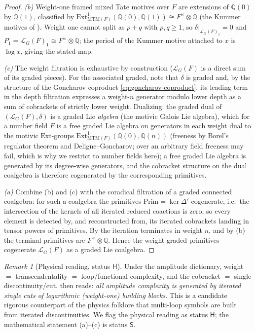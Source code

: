 \documentclass[12pt]{article}
\theoremstyle{definition}
\theoremstyle{remark}
\newtheorem{remark}[theorem]{Remark}
\newcommand{\LG}{\mathcal{L}_{G}}
\newcommand{\coA}{\Delta}
\newcommand{\cobr}{\delta}
\newcommand{\Prim}{\mathrm{Prim}}
\newcommand{\Qbb}{\mathbb{Q}}
\newcommand{\Slab}{\ensuremath{\mathsf{S}}}
\newcommand{\Hlab}{\ensuremath{\mathsf{H}}}
\begin{document}
\begin{proof}
\emph{(b)} Weight-one framed mixed Tate motives over $F$ are extensions of $\Qbb(0)$ by
$\Qbb(1)$, classified by $\mathrm{Ext}^1_{\mathrm{MTM}(F)}(\Qbb(0),\Qbb(1))\cong
F^\times\otimes\Qbb$ (the Kummer motives of ). Weight one cannot split as
$p+q$ with $p,q\ge 1$, so $\cobr|_{\LG(F)_1}=0$ and $P_1=\LG(F)_1\cong F^\times\otimes\Qbb$;
the period of the Kummer motive attached to $x$ is $\log x$, giving the stated map.

\emph{(c)} The weight filtration is exhaustive by construction ($\LG(F)$ is a direct sum of
its graded pieces). For the associated graded, note that $\cobr$ is graded and, by the
structure of the Goncharov coproduct \eqref{eq:goncharov-coproduct}, its leading term in the
depth filtration expresses a weight-$n$ generator modulo lower depth as a sum of cobrackets
of strictly lower weight. Dualizing: the graded dual of $(\LG(F),\cobr)$ is a graded Lie
\emph{algebra} (the motivic Galois Lie algebra), which for a number field $F$ is a free
graded Lie algebra on generators in each weight dual to the motivic $\mathrm{Ext}$-groups
$\mathrm{Ext}^1_{\mathrm{MTM}(F)}(\Qbb(0),\Qbb(n))$ (freeness by Borel's regulator theorem
and Deligne--Goncharov; over an arbitrary field freeness may fail, which is why we restrict
to number fields here); a free graded Lie algebra is generated by its degree-wise generators,
and the cobracket structure on the dual coalgebra is therefore cogenerated by the
corresponding primitives.

\emph{(a)} Combine (b) and (c) with the coradical filtration of a graded connected coalgebra:
for such a coalgebra the primitives $\Prim=\ker\coA'$ cogenerate, i.e.\ the intersection of
the kernels of all iterated reduced coactions is zero, so every element is detected by, and
reconstructed from, its iterated cobrackets landing in tensor powers of primitives. By
 the iteration terminates in weight $n$, and by (b) the terminal
primitives are $F^\times\otimes\Qbb$. Hence the weight-graded primitives cogenerate $\LG(F)$
as a graded Lie coalgebra.
\end{proof}

\begin{remark}[Physical reading, status \Hlab]
Under the amplitude dictionary, weight $=$ transcendentality $=$ loop/functional complexity,
and the cobracket $=$ single discontinuity/cut.  then reads: \emph{all
amplitude complexity is generated by iterated single cuts of logarithmic (weight-one)
building blocks.} This is a candidate rigorous counterpart of the physics folklore that
multi-loop symbols are built from iterated discontinuities. We flag the physical reading as
status \Hlab; the mathematical statement (a)--(c) is status \Slab.
\end{remark}
\end{document}
